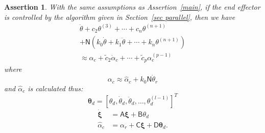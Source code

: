 \documentclass[oneside,twocolumn,reqno]{amsart}
\newtheorem{assertion}{Assertion}
\begin{document}
\begin{assertion}
\label{pre main}
With the same assumptions as Assertion~\ref{main}, if the end effector is controlled by the algorithm given in Section~\ref{sec parallel}, then we have
\begin{multline}
\label{system passive load alpha}
\ddot\theta + c_2 \theta^{(3)} + \cdots + c_n \theta^{(n+1)} \\
+ \mathsf N (k_0 \dot\theta + k_1 \ddot\theta + \cdots + k_n \theta^{(n+1)}) \\
\approx \alpha_c  + \tilde c_2 \dot \alpha_c + \cdots + \tilde c_p \alpha_c^{(p-1)}
\end{multline}
where
\begin{equation}
\alpha_c \approx \hat\alpha_c + k_0 \mathsf N \dot\theta_r
\end{equation}
and $\hat\alpha_c$ is calculated thus:
\begin{equation}
\bm \theta_d = [\theta_d, \dot \theta_d, \ddot \theta_d, \dots, \theta_d^{(l-1)}]^T
\end{equation}
\begin{align}
\dot {\bm \xi} &= \mathsf A \bm \xi + \mathsf B \theta_d \\
\hat\alpha_c &= \alpha_r + \mathsf C \bm \xi + \mathsf D \bm \theta_d.
\end{align}
\end{assertion}
\end{document}
